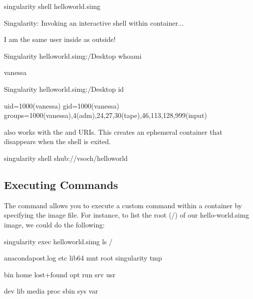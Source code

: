 \documentclass[letterpaper,10pt,english]{sphinxmanual}
\begin{document}
%
\begin{sphinxVerbatim}[commandchars=\\\{\}]
\PYGZdl{} singularity shell hello\PYGZhy{}world.simg

Singularity: Invoking an interactive shell within container...


\PYGZsh{} I am the same user inside as outside!

Singularity hello\PYGZhy{}world.simg:\PYGZti{}/Desktop\PYGZgt{} whoami

vanessa


Singularity hello\PYGZhy{}world.simg:\PYGZti{}/Desktop\PYGZgt{} id

uid=1000(vanessa) gid=1000(vanessa) groups=1000(vanessa),4(adm),24,27,30(tape),46,113,128,999(input)
\end{sphinxVerbatim}

 also works with the  and  URIs. This creates an ephemeral container that
disappears when the shell is exited.

%
\begin{sphinxVerbatim}[commandchars=\\\{\}]
\PYGZdl{} singularity shell shub://vsoch/hello\PYGZhy{}world
\end{sphinxVerbatim}


\subsection{Executing Commands}
\label{\detokenize{quick_start:executing-commands}}
The {\hyperref[\detokenize{appendix:exec-command}]{}} command allows you to execute a custom command within a container by
specifying the image file. For instance, to list the root (/) of our
hello-world.simg image, we could do the following:

%
\begin{sphinxVerbatim}[commandchars=\\\{\}]
\PYGZdl{} singularity exec hello\PYGZhy{}world.simg ls /

anaconda\PYGZhy{}post.log  etc   lib64       mnt   root  singularity  tmp

bin        home  lost+found  opt   run   srv          usr

dev        lib   media       proc  sbin  sys          var
\end{sphinxVerbatim}
\end{document}
